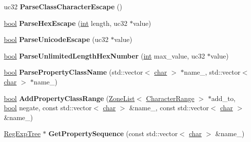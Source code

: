 \begin{DoxyCompactItemize}
\item 
\mbox{\label{classv8_1_1internal_1_1RegExpParser_a0524e5a4774361f55698c3042474ef54}} 
uc32 {\bfseries Parse\+Class\+Character\+Escape} ()
\item 
\mbox{\label{classv8_1_1internal_1_1RegExpParser_a323a54790c9e53ce4b76b77b95265718}} 
\mbox{\hyperlink{classbool}{bool}} {\bfseries Parse\+Hex\+Escape} (\mbox{\hyperlink{classint}{int}} length, uc32 $\ast$value)
\item 
\mbox{\label{classv8_1_1internal_1_1RegExpParser_ad5fffbd00cb457b1aa5ba19525757f05}} 
\mbox{\hyperlink{classbool}{bool}} {\bfseries Parse\+Unicode\+Escape} (uc32 $\ast$value)
\item 
\mbox{\label{classv8_1_1internal_1_1RegExpParser_a4b4d8a1fa9a352c7a7d2864cdd996ce1}} 
\mbox{\hyperlink{classbool}{bool}} {\bfseries Parse\+Unlimited\+Length\+Hex\+Number} (\mbox{\hyperlink{classint}{int}} max\+\_\+value, uc32 $\ast$value)
\item 
\mbox{\label{classv8_1_1internal_1_1RegExpParser_a5e2b7f9e077f4eae79a8650368f3caeb}} 
\mbox{\hyperlink{classbool}{bool}} {\bfseries Parse\+Property\+Class\+Name} (std\+::vector$<$ \mbox{\hyperlink{classchar}{char}} $>$ $\ast$name\+\_, std\+::vector$<$ \mbox{\hyperlink{classchar}{char}} $>$ $\ast$name\+\_)
\item 
\mbox{\label{classv8_1_1internal_1_1RegExpParser_ab61fdcfbb90aed1dd15316a452a722da}} 
\mbox{\hyperlink{classbool}{bool}} {\bfseries Add\+Property\+Class\+Range} (\mbox{\hyperlink{classv8_1_1internal_1_1ZoneList}{Zone\+List}}$<$ \mbox{\hyperlink{classv8_1_1internal_1_1CharacterRange}{Character\+Range}} $>$ $\ast$add\+\_\+to, \mbox{\hyperlink{classbool}{bool}} negate, const std\+::vector$<$ \mbox{\hyperlink{classchar}{char}} $>$ \&name\+\_, const std\+::vector$<$ \mbox{\hyperlink{classchar}{char}} $>$ \&name\+\_)
\item 
\mbox{\label{classv8_1_1internal_1_1RegExpParser_a9047d3204ce125937b1430ef229242da}} 
\mbox{\hyperlink{classv8_1_1internal_1_1RegExpTree}{Reg\+Exp\+Tree}} $\ast$ {\bfseries Get\+Property\+Sequence} (const std\+::vector$<$ \mbox{\hyperlink{classchar}{char}} $>$ \&name\+\_)

\end{DoxyCompactItemize}
